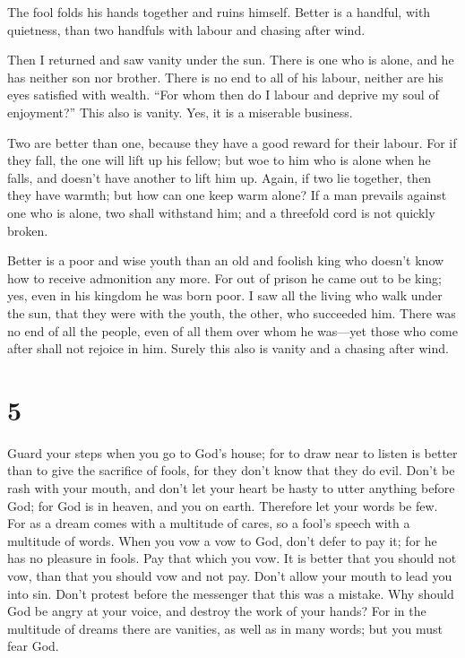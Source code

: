  The fool folds his hands together and ruins himself.
 Better is a handful, with quietness, than two handfuls
with labour and chasing after wind.

 Then I returned and saw vanity under the sun.
 There is one who is alone, and he has neither son nor
brother. There is no end to all of his labour, neither are his eyes
satisfied with wealth. ``For whom then do I labour and deprive my soul
of enjoyment?'' This also is vanity. Yes, it is a miserable business.

 Two are better than one, because they have a good reward
for their labour.  For if they fall, the one will lift up
his fellow; but woe to him who is alone when he falls, and doesn't have
another to lift him up.  Again, if two lie together, then
they have warmth; but how can one keep warm alone?  If a
man prevails against one who is alone, two shall withstand him; and a
threefold cord is not quickly broken.

 Better is a poor and wise youth than an old and foolish
king who doesn't know how to receive admonition any more.
 For out of prison he came out to be king; yes, even in
his kingdom he was born poor.  I saw all the living who
walk under the sun, that they were with the youth, the other, who
succeeded him.  There was no end of all the people, even
of all them over whom he was---yet those who come after shall not
rejoice in him. Surely this also is vanity and a chasing after wind.

\hypertarget{section-4}{%
\section{5}\label{section-4}}

 Guard your steps when you go to God's house; for to draw
near to listen is better than to give the sacrifice of fools, for they
don't know that they do evil.  Don't be rash with your
mouth, and don't let your heart be hasty to utter anything before God;
for God is in heaven, and you on earth. Therefore let your words be few.
 For as a dream comes with a multitude of cares, so a
fool's speech with a multitude of words.  When you vow a
vow to God, don't defer to pay it; for he has no pleasure in fools. Pay
that which you vow.  It is better that you should not vow,
than that you should vow and not pay.  Don't allow your
mouth to lead you into sin. Don't protest before the messenger that this
was a mistake. Why should God be angry at your voice, and destroy the
work of your hands?  For in the multitude of dreams there
are vanities, as well as in many words; but you must fear God.

